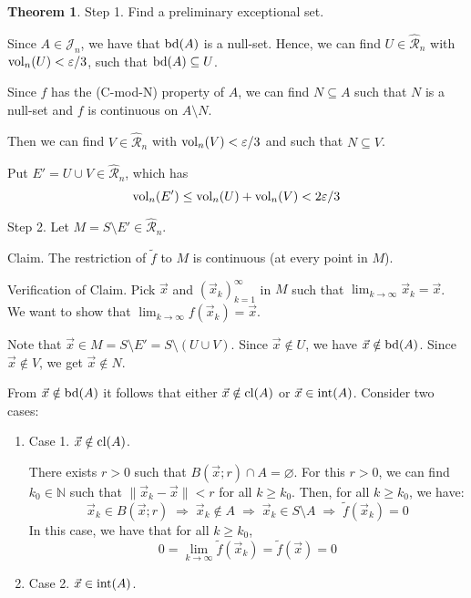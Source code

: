 \documentclass[11pt]{article}
\theoremstyle{definition}
\newtheorem{thm}{Theorem}[section]
\newcommand{\N}{\ensuremath{\mathbb{N}}}
\begin{document}
\begin{thm}
{\sc Step 1.} Find a preliminary exceptional set.

Since $A \in \mathcal{J}_n$, we have that ${\rm bd}(A)$ is a null-set. Hence, we can find $U \in \widehat{\mathcal{R}}_n$ with ${\rm vol}_n(U) < \varepsilon / 3$, such that ${\rm bd}(A) \subseteq U$. 

Since $f$ has the (C-mod-N) property of $A$, we can find $N \subseteq A$ such that $N$ is a null-set and $f$ is continuous on $A \setminus N$. 

Then we can find $V \in \widehat{\mathcal{R}}_n$ with ${\rm vol}_n(V) < \varepsilon / 3$ and such that $N \subseteq V$. 

Put $E' = U \cup V \in \widehat{\mathcal{R}}_n$, which has
$${\rm vol}_n(E') \leq {\rm vol}_n(U) + {\rm vol}_n(V) < 2\varepsilon / 3$$

{\sc Step 2.} Let $M = S \setminus E' \in \widehat{\mathcal{R}}_n$. 

{\sc Claim.} The restriction of $\tilde{f}$ to $M$ is continuous (at every point in $M$).

{\sc Verification of Claim.} Pick $\vec{x}$ and $(\vec{x}_k)_{k=1}^\infty$ in $M$ such that $\lim_{k\to\infty} \vec{x}_k = \vec{x}$. We want to show that $\lim_{k\to\infty} f(\vec{x}_k) = \vec{x}$. 

Note that $\vec{x} \in M = S \setminus E' = S \setminus (U \cup V)$. Since $\vec{x} \notin U$, we have $\vec{x} \notin {\rm bd}(A)$. Since $\vec{x} \notin V$, we get $\vec{x} \notin N$. 

From $\vec{x} \notin {\rm bd}(A)$ it follows that either $\vec{x} \notin {\rm cl}(A)$ or $\vec{x} \in {\rm int}(A)$. Consider two cases:\vspace{-1.5ex}
\begin{enumerate}[label={}]
\item {\sc Case 1.} $\vec{x} \notin {\rm cl}(A)$.

There exists $r > 0$ such that $B(\vec{x}; r) \cap A = \varnothing$. For this $r > 0$, we can find $k_0 \in \N$ such that $\|\vec{x}_k - \vec{x}\| < r$ for all $k \geq k_0$. Then, for all $k \geq k_0$, we have:
$$\vec{x}_k \in B(\vec{x}; r) \;\Rightarrow\; \vec{x}_k \notin A \;\Rightarrow\; \vec{x}_k \in S \setminus A \;\Rightarrow\; \tilde{f}(\vec{x}_k) = 0$$
In this case, we have that for all $k \geq k_0$,
$$0 = \lim_{k\to\infty} \tilde{f}(\vec{x}_k) = \tilde{f}(\vec{x}) = 0$$

\item {\sc Case 2.} $\vec{x} \in {\rm int}(A)$. 


\end{enumerate}
\end{thm}
\end{document}
